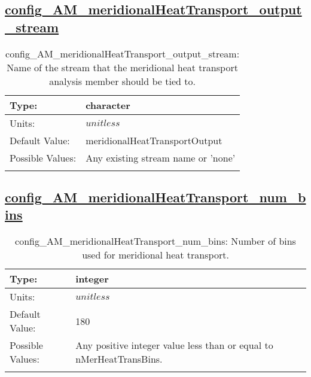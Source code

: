 \subsection[config\_AM\_meridionalHeatTransport\_output\_stream]{\hyperref[sec:nm_tab_AM_meridionalHeatTransport]{config\_AM\_meridionalHeatTransport\_output\_stream}}
\label{subsec:nm_sec_config_AM_meridionalHeatTransport_output_stream}
\begin{center}
\begin{longtable}{| p{2.0in} || p{4.0in} |}
    \hline
    Type: & character \\
    \hline
    Units: & $unitless$ \\
    \hline
    Default Value: & meridionalHeatTransportOutput \\
    \hline
    Possible Values: & Any existing stream name or 'none' \\
    \hline
    \caption{config\_AM\_meridionalHeatTransport\_output\_stream: Name of the stream that the meridional heat transport analysis member should be tied to.}
\end{longtable}
\end{center}
\subsection[config\_AM\_meridionalHeatTransport\_num\_bins]{\hyperref[sec:nm_tab_AM_meridionalHeatTransport]{config\_AM\_meridionalHeatTransport\_num\_bins}}
\label{subsec:nm_sec_config_AM_meridionalHeatTransport_num_bins}
\begin{center}
\begin{longtable}{| p{2.0in} || p{4.0in} |}
    \hline
    Type: & integer \\
    \hline
    Units: & $unitless$ \\
    \hline
    Default Value: & 180 \\
    \hline
    Possible Values: & Any positive integer value less than or equal to nMerHeatTransBins. \\
    \hline
    \caption{config\_AM\_meridionalHeatTransport\_num\_bins: Number of bins used for meridional heat transport.}
\end{longtable}
\end{center}
